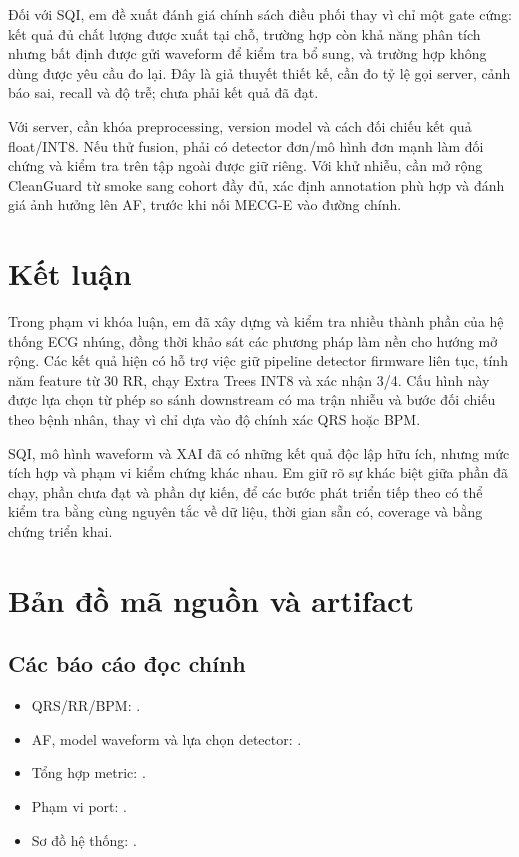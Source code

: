 \documentclass[12pt,a4paper,oneside]{report}
\begin{document}
Đối với SQI, em đề xuất đánh giá chính sách điều phối thay vì chỉ một gate cứng: kết quả đủ chất lượng được xuất tại chỗ, trường hợp còn khả năng phân tích nhưng bất định được gửi waveform để kiểm tra bổ sung, và trường hợp không dùng được yêu cầu đo lại. Đây là giả thuyết thiết kế, cần đo tỷ lệ gọi server, cảnh báo sai, recall và độ trễ; chưa phải kết quả đã đạt.

Với server, cần khóa preprocessing, version model và cách đối chiếu kết quả float/INT8. Nếu thử fusion, phải có detector đơn/mô hình đơn mạnh làm đối chứng và kiểm tra trên tập ngoài được giữ riêng. Với khử nhiễu, cần mở rộng CleanGuard từ smoke sang cohort đầy đủ, xác định annotation phù hợp và đánh giá ảnh hưởng lên AF, trước khi nối MECG-E vào đường chính.

\chapter{Kết luận}
Trong phạm vi khóa luận, em đã xây dựng và kiểm tra nhiều thành phần của hệ thống ECG nhúng, đồng thời khảo sát các phương pháp làm nền cho hướng mở rộng. Các kết quả hiện có hỗ trợ việc giữ pipeline detector firmware liên tục, tính năm feature từ 30 RR, chạy Extra Trees INT8 và xác nhận 3/4. Cấu hình này được lựa chọn từ phép so sánh downstream có ma trận nhiễu và bước đối chiếu theo bệnh nhân, thay vì chỉ dựa vào độ chính xác QRS hoặc BPM.

SQI, mô hình waveform và XAI đã có những kết quả độc lập hữu ích, nhưng mức tích hợp và phạm vi kiểm chứng khác nhau. Em giữ rõ sự khác biệt giữa phần đã chạy, phần chưa đạt và phần dự kiến, để các bước phát triển tiếp theo có thể kiểm tra bằng cùng nguyên tắc về dữ liệu, thời gian sẵn có, coverage và bằng chứng triển khai.

\appendix
\chapter{Bản đồ mã nguồn và artifact}
\section{Các báo cáo đọc chính}
\begin{itemize}
\item QRS/RR/BPM: .
\item AF, model waveform và lựa chọn detector: .
\item Tổng hợp metric: .
\item Phạm vi port: .
\item Sơ đồ hệ thống: .
\end{itemize}
\end{document}
